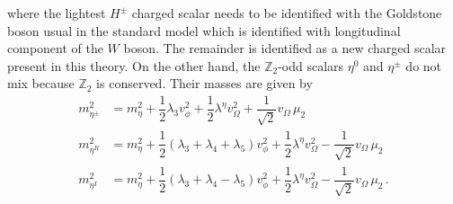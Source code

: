 \documentclass[12pt,letterpaper]{article}
\begin{document}
%
where the lightest $H^{\pm}$ charged scalar needs to be identified with the Goldstone boson usual in the standard model which is identified with longitudinal component of the $W$ boson. The remainder is identified as a new charged scalar present in this theory.  
%
On the other hand, the $\mathbb{Z}_2$-odd scalars $\eta^0$ and $\eta^{\pm}$ do not mix because $\mathbb{Z}_2$ is conserved. Their masses are given by
%
\begin{align}
\label{eq:masa-etapm}
m_{\eta^\pm}^2 &= m_{\eta}^2 + \dfrac{1}{2}\lambda_3v_{\phi}^2 
+ \dfrac{1}{2}\lambda^{\eta}v_{\Omega}^2 + \dfrac{1}{\sqrt{2}}v_{\Omega}\,\mu_2 \\
\label{eq:masa-etaR}
m_{\eta^R}^2 &= m_{\eta}^2 + \dfrac{1}{2}\left(\lambda_3+\lambda_4+\lambda_5\right) v_{\phi}^2
+ \dfrac{1}{2}\lambda^{\eta}v_{\Omega}^2 - \dfrac{1}{\sqrt{2}}v_{\Omega}\,\mu_2 \\
\label{eq:masa-etapI}
m_{\eta^I}^2 &= m_{\eta}^2 + \dfrac{1}{2}\left(\lambda_3+\lambda_4-\lambda_5\right) v_{\phi}^2
+ \dfrac{1}{2}\lambda^{\eta}v_{\Omega}^2 - \dfrac{1}{\sqrt{2}}v_{\Omega}\,\mu_2\,.
\end{align}
\end{document}
